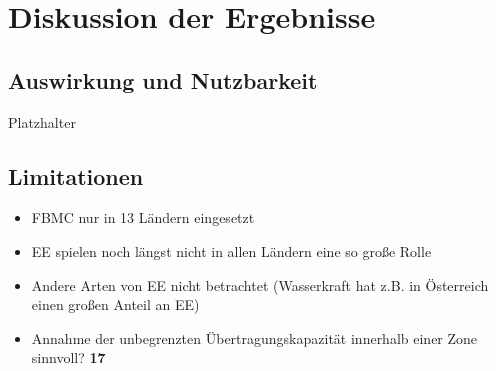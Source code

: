 \section{Diskussion der Ergebnisse}
\label{sec:Diskussion der Ergebnisse}

\subsection{Auswirkung und Nutzbarkeit}
\label{sec:Auswirkung und Nutzbarkeit}
Platzhalter

\subsection{Limitationen}
\label{sec:Limitationen}

\begin{itemize}
    \item FBMC nur in 13 Ländern eingesetzt
    \item EE spielen noch längst nicht in allen Ländern eine so große Rolle
    \item Andere Arten von EE nicht betrachtet (Wasserkraft hat z.B. in Österreich einen großen Anteil an EE)
    \item Annahme der unbegrenzten Übertragungskapazität innerhalb einer Zone sinnvoll? \textbf{17}
\end{itemize}

